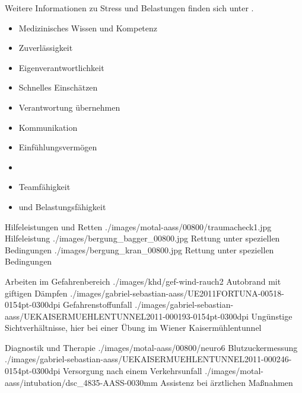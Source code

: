 {Weitere Informationen zu Stress und Belastungen finden sich
unter . 

}{%
\begin{itemize}
  \item Medizinisches Wissen und Kompetenz
  \item Zuverlässigkeit
  \item Eigenverantwortlichkeit
  \item Schnelles Einschätzen
  \item Verantwortung übernehmen
  \item Kommunikation
  \item Einfühlungsvermögen
  \item {}
  \item Teamfähigkeit
  \item {} und  Belastungsfähigkeit
\end{itemize}
}{}{}{}


\begin{Synopsis}
\end{Synopsis}


\begin{PictureSeriesWide}{}{Hilfeleistungen und Retten}
{./images/motal-aass/00800/traumacheck1.jpg}
{Hilfeleistung}
{./images/bergung_bagger_00800.jpg}
{Rettung unter speziellen Bedingungen}
{./images/bergung_kran_00800.jpg}
{Rettung unter speziellen Bedingungen}
{}
{}
\end{PictureSeriesWide}

\begin{PictureSeriesWide}{}{Arbeiten im Gefahrenbereich}
{./images/khd/gef-wind-rauch2}
{Autobrand mit giftigen Dämpfen}
{./images/gabriel-sebastian-aass/UE2011FORTUNA-00518-0154pt-0300dpi}
{Gefahrenstoffunfall}
{./images/gabriel-sebastian-aass/UEKAISERMUEHLENTUNNEL2011-000193-0154pt-0300dpi}
{Ungünstige Sichtverhältnisse, hier bei
einer Übung im Wiener Kaisermühlentunnel}
{}
{}
\end{PictureSeriesWide}


\begin{PictureSeriesWide}{}{Diagnostik und Therapie}
{./images/motal-aass/00800/neuro6}
{Blutzuckermessung}
{./images/gabriel-sebastian-aass/UEKAISERMUEHLENTUNNEL2011-000246-0154pt-0300dpi}
{Versorgung nach einem Verkehrsunfall}
{./images/motal-aass/intubation/dsc_4835-AASS-0030mm}
{Assistenz bei ärztlichen Maßnahmen}
{}
{}
\end{PictureSeriesWide}

